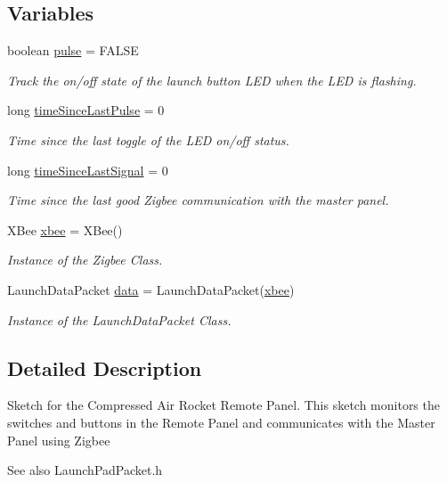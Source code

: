 \subsection*{\-Variables}
\begin{DoxyCompactItemize}
\item 
boolean \hyperlink{remotePanel_8ino_a5583bd11885b1c22517a2478981867ca}{pulse} = \-F\-A\-L\-S\-E
\begin{DoxyCompactList}\small\item\em \-Track the on/off state of the launch button \-L\-E\-D when the \-L\-E\-D is flashing. \end{DoxyCompactList}\item 
long \hyperlink{remotePanel_8ino_af8d9d76d18b6aee4b209d4f3b9f2d8d3}{time\-Since\-Last\-Pulse} = 0
\begin{DoxyCompactList}\small\item\em \-Time since the last toggle of the \-L\-E\-D on/off status. \end{DoxyCompactList}\item 
long \hyperlink{remotePanel_8ino_a925c32c87cdf25a3c9fde672e4dffec6}{time\-Since\-Last\-Signal} = 0
\begin{DoxyCompactList}\small\item\em \-Time since the last good \-Zigbee communication with the master panel. \end{DoxyCompactList}\item 
\-X\-Bee \hyperlink{remotePanel_8ino_a18bbd7dece9ef587254b08710426fd17}{xbee} = \-X\-Bee()
\begin{DoxyCompactList}\small\item\em \-Instance of the \-Zigbee \-Class. \end{DoxyCompactList}\item 
\-Launch\-Data\-Packet \hyperlink{remotePanel_8ino_a2581ee7316bbd0b2c1f26d7892d9383b}{data} = \-Launch\-Data\-Packet(\hyperlink{remotePanel_8ino_a18bbd7dece9ef587254b08710426fd17}{xbee})
\begin{DoxyCompactList}\small\item\em \-Instance of the \-Launch\-Data\-Packet \-Class. \end{DoxyCompactList}\end{DoxyCompactItemize}


\subsection{\-Detailed \-Description}
\-Sketch for the \-Compressed \-Air \-Rocket \-Remote \-Panel. \-This sketch monitors the switches and buttons in the \-Remote \-Panel and communicates with the \-Master \-Panel using \-Zigbee \begin{DoxySeeAlso}{\-See also}
\-Launch\-Pad\-Packet.\-h 
\end{DoxySeeAlso}


